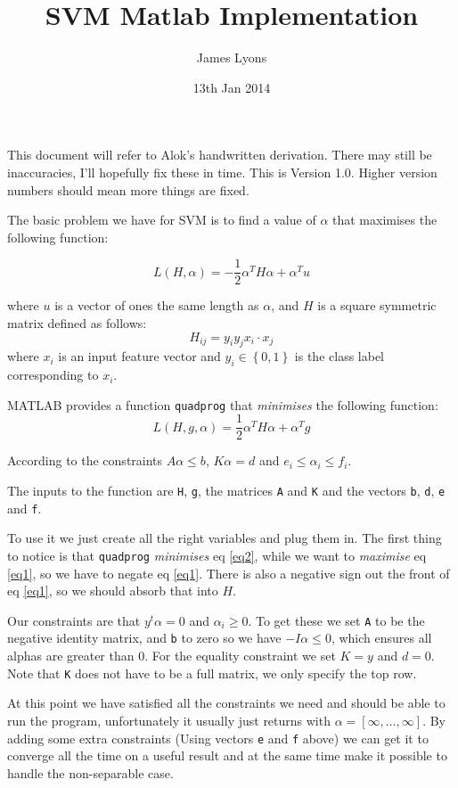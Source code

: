\documentclass[a4paper,10pt]{article}
\title{SVM Matlab Implementation \VersionNum}
\author{James Lyons}
\date{13th Jan 2014}
\newcommand{\VersionNum}{Version 1.0}
\begin{document}
\maketitle

This document will refer to Alok's handwritten derivation. There may still be inaccuracies, I'll hopefully fix these in time. This is \VersionNum. Higher version numbers should mean more things are fixed.

The basic problem we have for SVM is to find a value of $\alpha$ that maximises the following function:

\begin{equation}\label{eq1} L(H,\alpha) = -\dfrac{1}{2}\alpha^T H \alpha + \alpha^T u \end{equation}

where $u$ is a vector of ones the same length as $\alpha$, and $H$ is a square symmetric matrix defined as follows:
\[ H_{ij} = y_i y_j x_i \cdotp x_j \]
where $x_i$ is an input feature vector and $y_i \in \left\{0,1\right\}$ is the class label corresponding to $x_i$.

MATLAB provides a function \texttt{quadprog} that \textit{minimises} the following function:
\begin{equation}\label{eq2} L(H,g,\alpha) = \dfrac{1}{2}\alpha^T H \alpha + \alpha^T g \end{equation}

According to the constraints $A\alpha \leq b$, $K\alpha = d$ and $e_i \leq \alpha_i \leq f_i$.

The inputs to the function are \texttt{H}, \texttt{g}, the matrices \texttt{A} and \texttt{K} and the vectors \texttt{b}, \texttt{d}, \texttt{e} and \texttt{f}.

To use it we just create all the right variables and plug them in. The first thing to notice is that \texttt{quadprog} \textit{minimises} eq \ref{eq2}, while we want to 
\textit{maximise} eq \ref{eq1}, so we have to negate eq \ref{eq1}. There is also a negative sign out the front of eq \ref{eq1}, so we should absorb that into $H$.

Our constraints are that $y^t\alpha = 0$ and $\alpha_i \geq 0$. To get these we set \texttt{A} to be the negative identity matrix, and \texttt{b} to zero so we have
$-I\alpha \leq 0$, which ensures all alphas are greater than 0. For the equality constraint we set $K = y$ and $d=0$. Note that \texttt{K} does not have to be a full matrix, we only
specify the top row. 

At this point we have satisfied all the constraints we need and should be able to run the program, unfortunately it usually just returns with $\alpha = [\infty,\ldots,\infty]$. By adding
some extra constraints (Using vectors \texttt{e} and \texttt{f} above) we can get it to converge all the time on a useful result and at the same time make it possible to handle the non-separable case.
\end{document}
